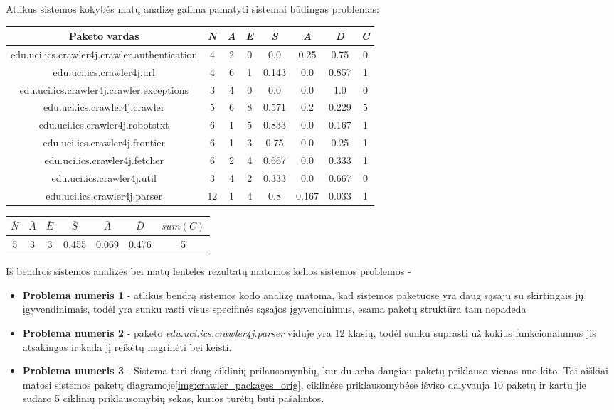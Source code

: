 Atlikus sistemos kokybės matų analizę galima pamatyti sistemai būdingas problemas:
\begin{center}
    \begin{tabular}{|c|c|c|c|c|c|c|c|}
        \hline
        Paketo vardas & \textit{N} & \textit{A} & \textit{E} & \textit{S} & \textit{A} & \textit{D} & \textit{C} \\ [0.5ex]
        \hline\hline
        edu.uci.ics.crawler4j.crawler.authentication & 4 & 2 & 0 & 0.0 & 0.25 & 0.75 & 0\\
        \hline
        edu.uci.ics.crawler4j.url & 4 & 6 & 1 & 0.143 & 0.0 & 0.857 & 1 \\
        \hline
        edu.uci.ics.crawler4j.crawler.exceptions & 3 & 4 & 0 & 0.0 & 0.0 & 1.0 & 0\\
        \hline
        edu.uci.ics.crawler4j.crawler & 5 & 6 & 8 & 0.571 & 0.2 & 0.229 & 5 \\
        \hline
        edu.uci.ics.crawler4j.robotstxt & 6 & 1 & 5 & 0.833 & 0.0 & 0.167 & 1 \\
        \hline
        edu.uci.ics.crawler4j.frontier & 6 & 1 & 3 & 0.75 & 0.0 & 0.25 & 1 \\
        \hline
        edu.uci.ics.crawler4j.fetcher & 6 & 2 & 4 & 0.667 & 0.0 & 0.333 & 1 \\
        \hline
        edu.uci.ics.crawler4j.util & 3 & 4 & 2 & 0.333 & 0.0 & 0.667 & 0 \\
        \hline
        edu.uci.ics.crawler4j.parser & 12 & 1 & 4 & 0.8 & 0.167 & 0.033 & 1 \\
        \hline
    \end{tabular}
    \begin{tabular}{|c|c|c|c|c|c|c|}
        \hline
        $\bar{N}$ & $\bar{A}$ & $\bar{E}$ & $\bar{S}$ & $\bar{A}$ & $\bar{D}$ & $sum(C)$ \\ [0.5ex]
        \hline\hline
        5 & 3 & 3 & 0.455 & 0.069 & 0.476 & 5\\
        \hline
    \end{tabular}
\end{center}
Iš bendros sistemos analizės bei matų lentelės rezultatų matomos kelios sistemos problemos -
\begin{itemize}
    \item \textbf{Problema numeris 1} - atlikus bendrą sistemos kodo analizę matoma,
    kad sistemos paketuose yra daug sąsajų su skirtingais jų įgyvendinimais, todėl yra sunku
    rasti visus specifinės sąsajos įgyvendinimus, esama paketų struktūra tam nepadeda
    \item \textbf{Problema numeris 2} - paketo \textit{edu.uci.ics.crawler4j.parser} viduje yra 12 klasių, todėl sunku suprasti už kokius funkcionalumus jis atsakingas
    ir kada jį reikėtų nagrinėti bei keisti.
    \item \textbf{Problema numeris 3} - Sistema turi daug ciklinių prilausomynbių, kur du arba daugiau paketų priklauso vienas nuo kito.
    Tai aiškiai matosi sistemos paketų diagramoje\ref{img:crawler_packages_orig}, ciklinėse priklausomybėse išviso dalyvauja 10 paketų ir kartu jie sudaro 5 ciklinių priklausomybių sekas,
    kurios turėtų būti pašalintos.
\end{itemize}

